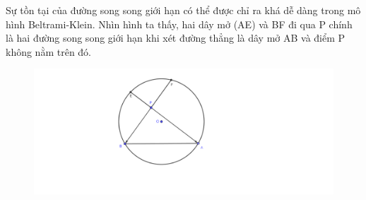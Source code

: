 Sự tồn tại của  đường song song giới hạn có thể được chỉ ra khá dễ dàng trong mô hình Beltrami-Klein. Nhìn hình ta thấy, hai dây mở (AE) và BF đi qua P chính là hai đường song song giới hạn khi xét đường thẳng là dây mở AB và điểm P không nằm trên đó.

\begin{figure}[ht]
\includegraphics[width=\textwidth]{Duong_song_song_gioi_han_Klein.pdf}
\end{figure}	
	
	
